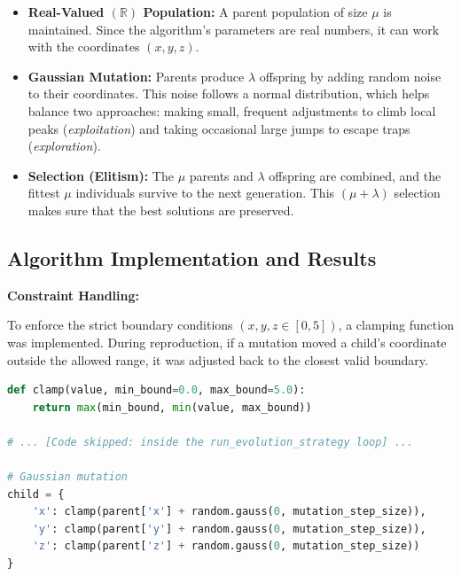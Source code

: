 \documentclass[12pt, a4paper]{article}
\begin{document}
\begin{itemize}
    \item \textbf{Real-Valued $(\mathbb{R})$ Population:} A parent population of size $\mu$ is maintained. Since the algorithm's parameters are real numbers, it can work with the coordinates $(x, y, z)$.

    \item \textbf{Gaussian Mutation:} Parents produce $\lambda$ offspring by adding random noise to their coordinates. This noise follows a normal distribution, which helps balance two approaches: making small, frequent adjustments to climb local peaks (\textit{exploitation}) and taking occasional large jumps to escape traps (\textit{exploration}).

    \item \textbf{Selection (Elitism):} The $\mu$ parents and $\lambda$ offspring are combined, and the fittest $\mu$ individuals survive to the next generation. This $(\mu + \lambda)$ selection makes sure that the best solutions are preserved.
\end{itemize}

\newpage

\subsection{Algorithm Implementation and Results}

\vspace{0.5cm}

\textbf{Constraint Handling:}

\vspace{0.25cm}

To enforce the strict boundary conditions $(x, y, z \in [0, 5])$, a clamping function was implemented. During reproduction, if a mutation moved a child's coordinate outside the allowed range, it was adjusted back to the closest valid boundary.

\vspace{0.5cm}

\noindent\begin{minipage}{1\linewidth}
    \begin{lstlisting}[language=Python, caption=Constraint Handling and Mutation Logic, label=lst:constraint_and_mutation_1]
def clamp(value, min_bound=0.0, max_bound=5.0):
    return max(min_bound, min(value, max_bound))

# ... [Code skipped: inside the run_evolution_strategy loop] ...

# Gaussian mutation
child = {
    'x': clamp(parent['x'] + random.gauss(0, mutation_step_size)),
    'y': clamp(parent['y'] + random.gauss(0, mutation_step_size)),
    'z': clamp(parent['z'] + random.gauss(0, mutation_step_size))
}
    \end{lstlisting}
\end{minipage}
\end{document}
